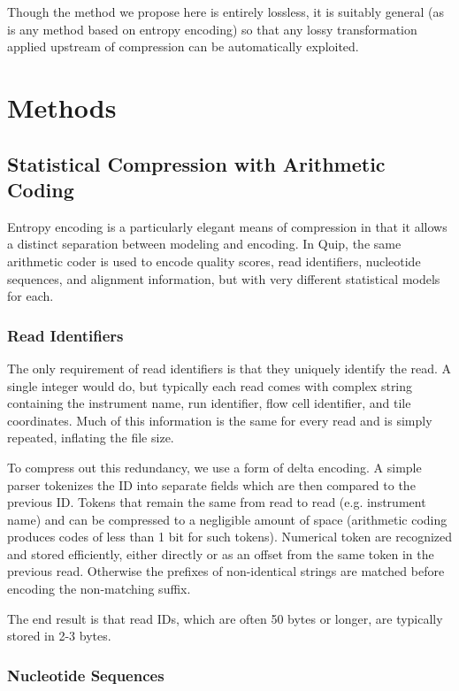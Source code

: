 \documentclass[twocolumn]{article}
\begin{document}

Though the method we propose here is entirely lossless, it is suitably general
(as is any method based on entropy encoding) so that any lossy transformation
applied upstream of compression can be automatically exploited.


\section{Methods}

\subsection{Statistical Compression with Arithmetic Coding}

Entropy encoding is a particularly elegant means of compression in that it
allows a distinct separation between modeling and encoding. In Quip, the same
arithmetic coder is used to encode quality scores, read identifiers,
nucleotide sequences, and alignment information, but with very different
statistical models for each.


\subsubsection{Read Identifiers}

The only requirement of read identifiers is that they uniquely identify the
read. A single integer would do, but typically each read comes with complex
string containing the instrument name, run identifier, flow cell identifier,
and tile coordinates. Much of this information is the same for every read and
is simply repeated, inflating the file size.

To compress out this redundancy, we use a form of delta encoding. A simple
parser tokenizes the ID into separate fields which are then compared to the
previous ID. Tokens that remain the same from read to read (e.g. instrument
name) and can be compressed to a negligible amount of space (arithmetic coding
produces codes of less than 1 bit for such tokens). Numerical token are
recognized and stored efficiently, either directly or as an offset from the
same token in the previous read. Otherwise the prefixes of non-identical
strings are matched before encoding the non-matching suffix.

The end result is that read IDs, which are often 50 bytes or longer, are
typically stored in 2-3 bytes.


\subsubsection{Nucleotide Sequences}
\end{document}
